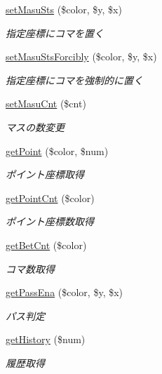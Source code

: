 \begin{DoxyCompactItemize}
\hyperlink{class_reversi_a26f3168c7d94e70d344841d65885a4ac}{set\+Masu\+Sts} (\$color, \$y, \$x)
\begin{DoxyCompactList}\small\item\em 指定座標にコマを置く \end{DoxyCompactList}\item 
\hyperlink{class_reversi_ae659a2ce33e395f8d5cda5e62d03fe7e}{set\+Masu\+Sts\+Forcibly} (\$color, \$y, \$x)
\begin{DoxyCompactList}\small\item\em 指定座標にコマを強制的に置く \end{DoxyCompactList}\item 
\hyperlink{class_reversi_ab6853cc0f53e50a70d576f15296f0864}{set\+Masu\+Cnt} (\$cnt)
\begin{DoxyCompactList}\small\item\em マスの数変更 \end{DoxyCompactList}\item 
\hyperlink{class_reversi_ad059cc09b0001edd980f43770380b863}{get\+Point} (\$color, \$num)
\begin{DoxyCompactList}\small\item\em ポイント座標取得 \end{DoxyCompactList}\item 
\hyperlink{class_reversi_af538d04718f177f71461f582f3bd8eba}{get\+Point\+Cnt} (\$color)
\begin{DoxyCompactList}\small\item\em ポイント座標数取得 \end{DoxyCompactList}\item 
\hyperlink{class_reversi_acb1491c467c3065beece256256f5f59d}{get\+Bet\+Cnt} (\$color)
\begin{DoxyCompactList}\small\item\em コマ数取得 \end{DoxyCompactList}\item 
\hyperlink{class_reversi_a123959981f8e1d48fc7b9d183a5c6d0a}{get\+Pass\+Ena} (\$color, \$y, \$x)
\begin{DoxyCompactList}\small\item\em パス判定 \end{DoxyCompactList}\item 
\hyperlink{class_reversi_a41cae82a798f2b3d0684bda44b837fcf}{get\+History} (\$num)
\begin{DoxyCompactList}\small\item\em 履歴取得 \end{DoxyCompactList}\item 

\end{DoxyCompactItemize}
